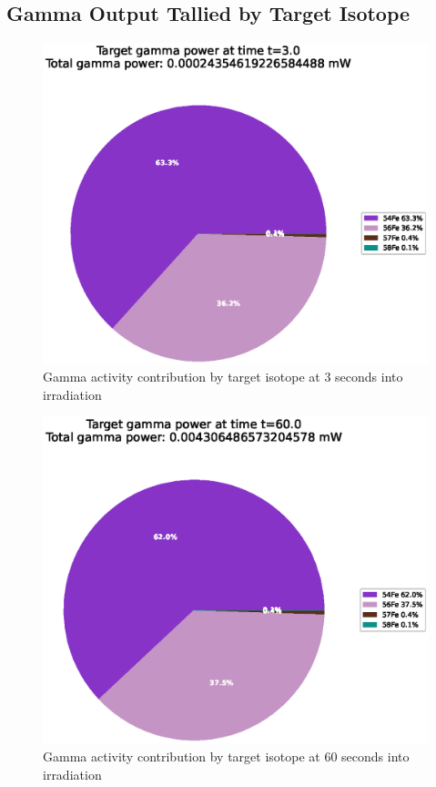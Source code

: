 \clearpage

\subsection{Gamma Output Tallied by Target Isotope}

\FloatBarrier


\begin{figure}[!htb]
\centering
\includegraphics[width=0.8\linewidth]{chapters/activity_code/fe-activity-v2/target-energy/0001_3.eps}
\caption{Gamma activity contribution by target isotope at 3 seconds into irradiation}
\label{fig:activity-v2-target-power-3s}
\end{figure}

\begin{figure}[!htb]
\centering
\includegraphics[width=0.8\linewidth]{chapters/activity_code/fe-activity-v2/target-energy/0020_60.eps}
\caption{Gamma activity contribution by target isotope at 60 seconds into irradiation}
\label{fig:activity-v2-target-power-60s}
\end{figure}

